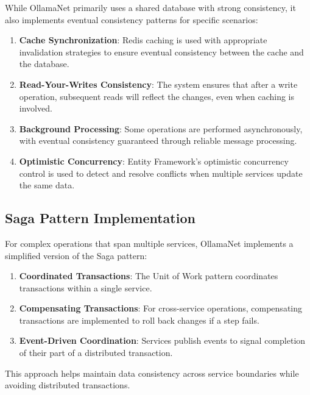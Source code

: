 While OllamaNet primarily uses a shared database with strong consistency, it also implements eventual consistency patterns for specific scenarios:

\begin{enumerate}
   \item \textbf{Cache Synchronization}: Redis caching is used with appropriate invalidation strategies to ensure eventual consistency between the cache and the database.

   \item \textbf{Read-Your-Writes Consistency}: The system ensures that after a write operation, subsequent reads will reflect the changes, even when caching is involved.

   \item \textbf{Background Processing}: Some operations are performed asynchronously, with eventual consistency guaranteed through reliable message processing.

   \item \textbf{Optimistic Concurrency}: Entity Framework's optimistic concurrency control is used to detect and resolve conflicts when multiple services update the same data.
\end{enumerate}

\subsection{Saga Pattern Implementation}

For complex operations that span multiple services, OllamaNet implements a simplified version of the Saga pattern:

\begin{enumerate}
   \item \textbf{Coordinated Transactions}: The Unit of Work pattern coordinates transactions within a single service.

   \item \textbf{Compensating Transactions}: For cross-service operations, compensating transactions are implemented to roll back changes if a step fails.

   \item \textbf{Event-Driven Coordination}: Services publish events to signal completion of their part of a distributed transaction.
\end{enumerate}

This approach helps maintain data consistency across service boundaries while avoiding distributed transactions.

